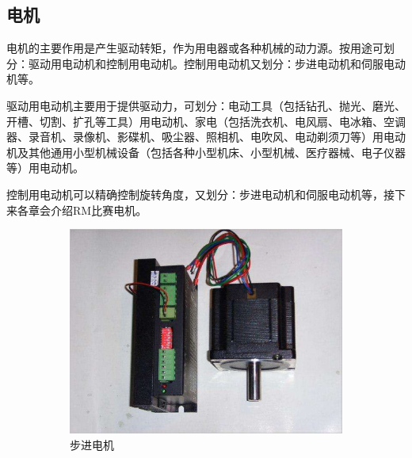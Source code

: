 \documentclass[UTF8]{article} %
\begin{document}
\subsection{电机}
电机的主要作用是产生驱动转矩，作为用电器或各种机械的动力源。按用途可划分：驱动用电动机和控制用电动机。控制用电动机又划分：步进电动机和伺服电动机等。

驱动用电动机主要用于提供驱动力，可划分：电动工具（包括钻孔、抛光、磨光、开槽、切割、扩孔等工具）用电动机、家电（包括洗衣机、电风扇、电冰箱、空调器、录音机、录像机、影碟机、吸尘器、照相机、电吹风、电动剃须刀等）用电动机及其他通用小型机械设备（包括各种小型机床、小型机械、医疗器械、电子仪器等）用电动机。

控制用电动机可以精确控制旋转角度，又划分：步进电动机和伺服电动机等，接下来各章会介绍RM比赛电机。

\begin{figure}[H]
  \centering
  \begin{subfigure}[b]{0.3\textwidth}
         \centering
         \includegraphics[width=\textwidth]{dj1.png}
          \caption{步进电机}
  \end{subfigure}
  \quad
  \begin{subfigure}[b]{0.22\textwidth}
          \centering

\end{subfigure}
\end{figure}
\end{document}
